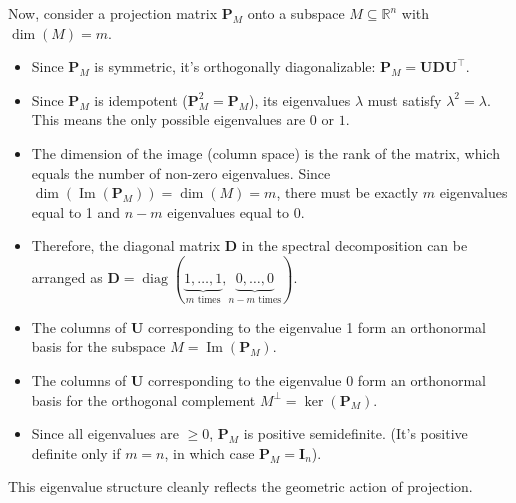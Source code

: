 \documentclass[11pt, letterpaper]{article}
\theoremstyle{definition}
\newcommand{\R}{\mathbb{R}}
\newcommand{\mat}[1]{\mathbf{#1}} %
\DeclareMathOperator{\im}{Im}       %
\DeclareMathOperator{\diag}{diag}   %
\begin{document}
Now, consider a projection matrix $\mat{P}_M$ onto a subspace $M \subseteq \R^n$ with $\dim(M)=m$.
\begin{itemize}
    \item Since $\mat{P}_M$ is symmetric, it's orthogonally diagonalizable: $\mat{P}_M = \mat{U}\mat{D}\mat{U}^{\top}$.
    \item Since $\mat{P}_M$ is idempotent ($\mat{P}_M^2 = \mat{P}_M$), its eigenvalues $\lambda$ must satisfy $\lambda^2 = \lambda$. This means the only possible eigenvalues are $0$ or $1$.
    \item The dimension of the image (column space) is the rank of the matrix, which equals the number of non-zero eigenvalues. Since $\dim(\im(\mat{P}_M)) = \dim(M) = m$, there must be exactly $m$ eigenvalues equal to 1 and $n-m$ eigenvalues equal to 0.
    \item Therefore, the diagonal matrix $\mat{D}$ in the spectral decomposition can be arranged as $\mat{D} = \diag(\underbrace{1, \dots, 1}_{m \text{ times}}, \underbrace{0, \dots, 0}_{n-m \text{ times}})$.
    \item The columns of $\mat{U}$ corresponding to the eigenvalue 1 form an orthonormal basis for the subspace $M = \im(\mat{P}_M)$.
    \item The columns of $\mat{U}$ corresponding to the eigenvalue 0 form an orthonormal basis for the orthogonal complement $M^{\perp} = \ker(\mat{P}_M)$.
    \item Since all eigenvalues are $\ge 0$, $\mat{P}_M$ is positive semidefinite. (It's positive definite only if $m=n$, in which case $\mat{P}_M = \mat{I}_n$).
\end{itemize}
This eigenvalue structure cleanly reflects the geometric action of projection.
\end{document}
